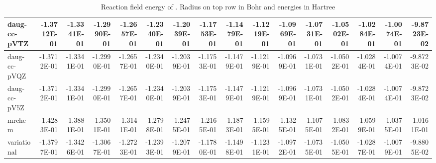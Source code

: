 \documentclass[../master_thesis.tex]{subfiles}
\begin{document}
\begin{table}
{{\begin{tabular}{|l|r|r|r|r|r|r|r|r|r|r|r|r|r|r|r|}
  daug-cc-pVTZ & -1.3712E-01 & -1.3341E-01 & -1.2990E-01 & -1.2657E-01 & -1.2340E-01 & -1.2039E-01 & -1.1753E-01 & -1.1479E-01 & -1.1219E-01 & -1.0969E-01 & -1.0731E-01 & -1.0502E-01 & -1.0284E-01 & -1.0074E-01 & -9.8723E-02 \\ \hline
  daug-cc-pVQZ & -1.3712E-01 & -1.3341E-01 & -1.2990E-01 & -1.2657E-01 & -1.2340E-01 & -1.2039E-01 & -1.1753E-01 & -1.1479E-01 & -1.1219E-01 & -1.0969E-01 & -1.0731E-01 & -1.0502E-01 & -1.0284E-01 & -1.0074E-01 & -9.8723E-02 \\ \hline
  daug-cc-pV5Z & -1.3712E-01 & -1.3341E-01 & -1.2990E-01 & -1.2657E-01 & -1.2340E-01 & -1.2039E-01 & -1.1753E-01 & -1.1479E-01 & -1.1219E-01 & -1.0969E-01 & -1.0731E-01 & -1.0502E-01 & -1.0284E-01 & -1.0074E-01 & -9.8723E-02 \\ \hline
  mrchem & -1.4283E-01 & -1.3881E-01 & -1.3501E-01 & -1.3141E-01 & -1.2798E-01 & -1.2475E-01 & -1.2165E-01 & -1.1873E-01 & -1.1595E-01 & -1.1325E-01 & -1.1075E-01 & -1.0832E-01 & -1.0599E-01 & -1.0375E-01 & -1.0161E-01 \\ \hline
  variational & -1.3797E-01 & -1.3426E-01 & -1.3067E-01 & -1.2723E-01 & -1.2393E-01 & -1.2079E-01 & -1.1780E-01 & -1.1498E-01 & -1.1231E-01 & -1.0972E-01 & -1.0735E-01 & -1.0505E-01 & -1.0287E-01 & -1.0079E-01 & -9.8805E-02 \\ \hline
  \end{tabular}}}{\caption{Reaction field energy of . Radius on top row in Bohr and energies in Hartree}
  \label{tab:Erdatalip}}
\end{table}
\end{document}
